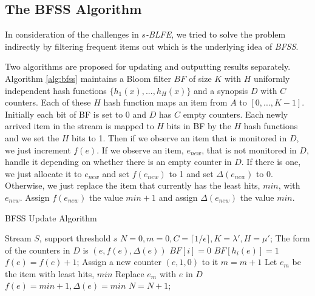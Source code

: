 \documentclass[conference]{IEEEtran}
\begin{document}
\subsection{The BFSS Algorithm}\label{sec:bfss}
In consideration of the challenges in $s$\emph{-BLFE}, we tried to solve the problem indirectly by filtering frequent items out which is the underlying idea of \emph{BFSS}.\par
Two algorithms are proposed for updating and outputting results separately. Algorithm \ref{alg:bfss} maintains a Bloom filter $BF$ of size $K$ with $H$ uniformly independent hash functions $\{h_1(x),...,h_H(x)\}$ and a synopsis $D$ with $C$ counters. Each of these $H$ hash function maps an item from $A$ to $[0,...,K-1]$. Initially each bit of BF is set to 0 and $D$ has $C$ empty counters. Each newly arrived item in the stream is mapped to $H$ bits in BF by the $H$ hash functions and we set the $H$ bits to 1. Then if we observe an item that is monitored in $D$, we just increment $f(e)$. If we observe an item, $e_{new}$, that is not monitored in $D$, handle it depending on whether there is an empty counter in $D$. If there is one, we just allocate it to $e_{new}$ and set $f(e_{new})$ to 1 and set $\Delta(e_{new})$ to 0. Otherwise, we just replace the item that currently has the least hits, $min$, with $e_{new}$. Assign $f(e_{new})$ the value $min+1$ and assign $\Delta(e_{new})$ the value $min$.\par

\begin{algorithm}[h]
	\caption{BFSS Update Algorithm}
	\label{alg:bfss}
\begin{algorithmic}[1]
	\REQUIRE Stream $S$, support threshold $s$
	\STATE $N=0,m=0,C=\lceil 1/\epsilon\rceil,K=\lambda',H=\mu'$; 
	\STATE The form of the counters in $D$ is $(e,f(e),\Delta(e))$
	\STATE $BF[i]=0$
	\ENDFOR
	\STATE $BF[h_i(e)]=1$
	\ENDFOR
	\STATE $f(e)=f(e)+1$;
	\STATE Assign a new counter $(e,1,0)$ to it
	\STATE $m=m+1$
	\ELSE
	\STATE Let $e_m$ be the item with least hits, $min$
	\STATE Replace $e_m$ with $e$ in $D$
	\STATE $f(e)=min+1,\Delta(e)=min$
	\ENDIF
	\STATE $N=N+1$;
	\ENDFOR
\end{algorithmic}
\end{algorithm}
\end{document}
